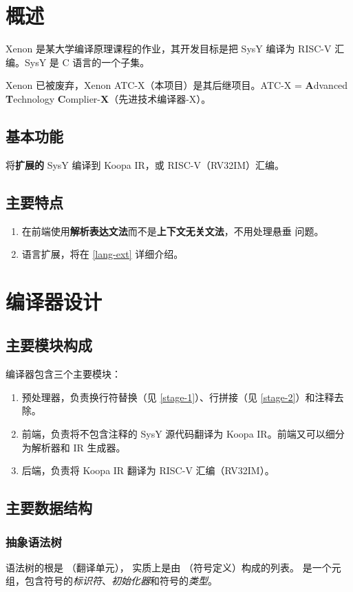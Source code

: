 \section{概述}
Xenon 是某大学编译原理课程的作业，其开发目标是把 SysY 编译为 RISC-V 汇编。SysY 是 C 语言的一个子集。

Xenon 已被废弃，Xenon ATC-X（本项目）是其后继项目。ATC-X = \textbf{A}dvanced \textbf{T}echnology \textbf{C}omplier-\textbf{X}（先进技术编译器-X）。
\subsection{基本功能}
将\textbf{扩展的} SysY 编译到 Koopa IR，或 RISC-V（RV32IM）汇编。
\subsection{主要特点}
\begin{enumerate}
    \item 在前端使用\textbf{解析表达文法}而不是\textbf{上下文无关文法}，不用处理悬垂  问题。
    \item 语言扩展，将在 \ref{lang-ext} 详细介绍。
\end{enumerate}
\section{编译器设计}
\subsection{主要模块构成}
编译器包含三个主要模块：
\begin{enumerate}
    \item 预处理器，负责换行符替换（见 \ref{stage-1}）、行拼接（见 \ref{stage-2}）和注释去除。
    \item 前端，负责将不包含注释的 SysY 源代码翻译为 Koopa IR。前端又可以细分为解析器和 IR 生成器。
    \item 后端，负责将 Koopa IR 翻译为 RISC-V 汇编（RV32IM）。
\end{enumerate}
\subsection{主要数据结构}
\subsubsection{抽象语法树}

语法树的根是 （翻译单元）， 实质上是由 （符号定义）构成的列表。 是一个元组，包含符号的\textit{标识符}、\textit{初始化器}和符号的\textit{类型}。

